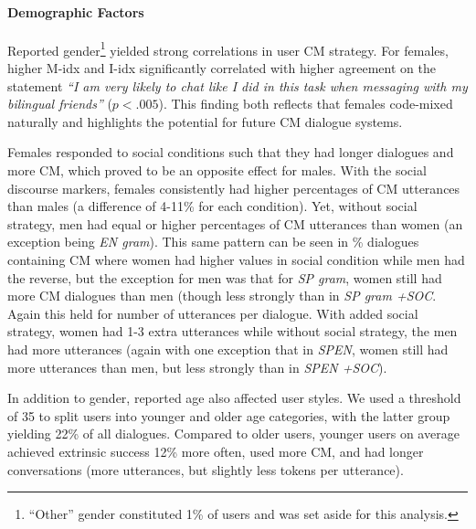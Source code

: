 \documentclass[11pt,a4paper]{article}
\newcommand{\ea}[1]{\textcolor{blue}{\bf\small [#1 --EA]}}
\begin{document}
\paragraph{Demographic Factors}
Reported gender\footnote{``Other'' gender constituted 1\% of users and was set aside for this analysis.} yielded strong correlations in user CM strategy.
For females, higher M-idx and I-idx significantly correlated with higher agreement on the statement \textit{``I am very likely to chat like I did in this task when messaging with my bilingual friends''} ($p < .005$).
This finding both reflects that females code-mixed naturally and highlights the potential for future CM dialogue systems.

Females responded to social conditions such that they had longer dialogues and more CM, which proved to be an opposite effect for males.
With the social discourse markers, females consistently had higher percentages of CM utterances than males (a difference of 4-11\% for each condition).
Yet, without social strategy, men had equal or higher percentages of CM utterances than women (an exception being \textit{EN gram}). 
This same pattern can be seen in \% dialogues containing CM where women had higher values in social condition while men had the reverse, but the exception for men was that for \textit{SP gram}, women still had more CM dialogues than men (though less strongly than in \textit{SP gram +SOC}.
Again this held for number of utterances per dialogue. 
With added social strategy, women had 1-3 extra utterances while without social strategy, the men had more utterances (again with one exception that in \textit{SP\textrightarrow EN}, women still had more utterances than men, but less strongly than in \textit{SP\textrightarrow EN +SOC}).

In addition to gender, reported age also affected user styles.
We used a threshold of 35 to split users into younger and older age categories, with the latter group yielding 22\% of all dialogues.
Compared to older users, younger users on average achieved extrinsic success 12\% more often, used more CM, and had longer conversations (more utterances, but slightly less tokens per utterance).

\end{document}
